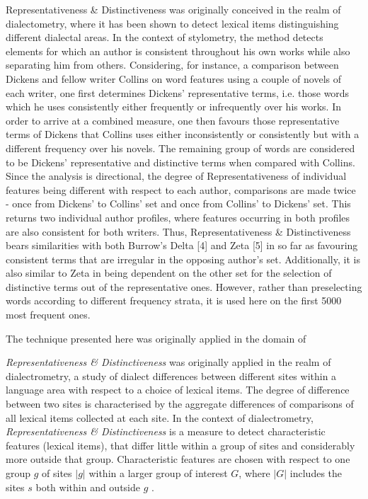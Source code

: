 \documentclass[a4paper,10pt,twoside,fleqn]{article}
\begin{document}
Representativeness \& Distinctiveness was originally conceived in the realm of dialectometry, where it has been
shown to detect lexical items distinguishing different dialectal areas. In the context of stylometry, the method
detects elements for which an author is consistent throughout his own works while also separating him from
others. Considering, for instance, a comparison between Dickens and fellow writer Collins on word features using a
couple of novels of each writer, one first determines Dickens' representative terms, i.e. those words which he
uses consistently either frequently or infrequently over his works. In order to arrive at a combined measure, one
then favours those representative terms of Dickens that Collins uses either inconsistently or consistently but with a
different frequency over his novels. The remaining group of words are considered to be Dickens' representative
and distinctive terms when compared with Collins. Since the analysis is directional, the degree of
Representativeness of individual features being different with respect to each author, comparisons are made twice
- once from Dickens' to Collins' set and once from Collins' to Dickens' set. This returns two individual author
profiles, where features occurring in both profiles are also consistent for both writers.
Thus, Representativeness \& Distinctiveness bears similarities with both Burrow's Delta [4] and Zeta [5] in so far as
favouring consistent terms that are irregular in the opposing author's set. Additionally, it is also similar to Zeta in
being dependent on the other set for the selection of distinctive terms out of the representative ones. However,
rather than preselecting words according to different frequency strata, it is used here on the first 5000 most
frequent ones.





The technique presented here was originally applied in the domain of 

\emph{Representativeness \& Distinctiveness} \cite{prokic2012detecting} was originally applied in the realm of dialectrometry, 
a study of dialect differences 
between different sites within a language area with respect to
a choice of lexical items. The degree of difference between two sites is characterised by the aggregate differences of comparisons 
of all lexical items collected at 
each site. In the context of dialectrometry, \emph{Representativeness \& Distinctiveness} is a measure to detect characteristic 
features (lexical items), that differ little within a group of sites 
and considerably more outside that group.
Characteristic features are chosen with respect to one group $g$ of sites $|g|$ within a larger group of interest $G$, where $|G|$ 
includes the sites $s$ both within and 
outside $g$ \cite{prokic2012detecting}.
\end{document}
